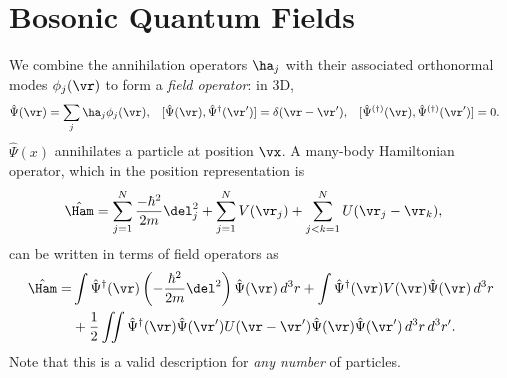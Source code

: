 \documentclass[a4paper, 11pt, normalem]{report}
\begin{document}
\section{Bosonic Quantum Fields}
We combine the annihilation operators $\ha_j$ with their associated orthonormal modes $\phi_j(\vr)$ to form a \emph{field operator}: in 3D,
\begin{align}
    \hat{\Psi}(\vr) &= \sum_j \ha_j\phi_j(\vr), & [\hat{\Psi}(\vr),\hat{\Psi}^\dagger(\vr')] &= \delta(\vr-\vr'), & [\hat{\Psi}^{(\dagger)}(\vr),\hat{\Psi}^{(\dagger)}(\vr')] &= 0.
\end{align}
$\hat{\Psi}(x)$ annihilates a particle at position $\vx$.
A many-body Hamiltonian operator, which in the position representation is
\begin{align}
    \hat{\Ham} &= \sum_{j=1}^N \frac{-\hbar^2}{2m}\del_j^2 + \sum_{j=1}^N V(\vr_j) + \sum_{j<k=1}^N U(\vr_j-\vr_k),
\end{align}
can be written in terms of field operators as
\begin{align}
    \begin{split}
        \hat{\Ham} = &\int \hat{\Psi}^\dagger(\vr)\left(-\frac{\hbar^2}{2m}\del^2\right)\hat{\Psi}(\vr)\,d^3r + \int \hat{\Psi}^\dagger(\vr)V(\vr)\hat{\Psi}(\vr)\,d^3 r \\
                     &+\frac12 \iint \hat{\Psi}^\dagger(\vr)\hat{\Psi}(\vr')U(\vr-\vr')\hat{\Psi}(\vr)\hat{\Psi}(\vr')\,d^3r\,d^3r'.
    \end{split}
\end{align}
Note that this is a valid description for \emph{any number} of particles.
\end{document}
